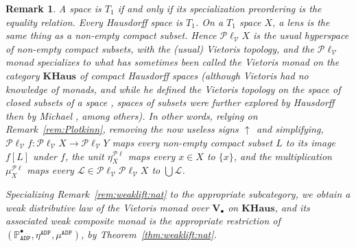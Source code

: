 \documentclass[preprint,12pt]{elsarticle}
\DeclareMathOperator{\upc}{\uparrow\!}
\newcommand\Pred{\mathbb{P}}
\newcommand\Angel{{\mathtt{A}}}
\newcommand\Demon{{\mathtt{D}}}
\newcommand\Nature{{\mathtt{P}}}
\newcommand\ADN{{\Angel\Demon\Nature}}
\newcommand\Plotkin{\mathcal P\ell} %
\newcommand\Plotkinn{\Plotkin_{\mathcal V}}
\newcommand\Val{{\mathbf V}}
\newtheorem{remark}[theorem]{Remark}
\begin{document}
\begin{remark}
  \label{rem:Vietoris}
  A space is $T_1$ if and only if its specialization preordering is
  the equality relation.  Every Hausdorff space is $T_1$.  On a $T_1$
  space $X$, a lens is the same thing as a non-empty compact subset.
  Hence $\Plotkinn X$ is the usual hyperspace of non-empty compact
  subsets, with the (usual) Vietoris topology, and the $\Plotkinn$
  monad specializes to what has sometimes been called the Vietoris
  monad on the category $\mathbf{KHaus}$ of compact Hausdorff spaces
  (although Vietoris had no knowledge of monads, and while he defined
  the Vietoris topology on the space of closed subsets of a space
  \cite{Vietoris:hyper}, spaces of subsets were further explored by
  Hausdorff \cite[\S 28]{Hausdorff:Mengen} then by Michael
  \cite{Michael:hyper}, among others).  In other words, relying on
  Remark~\ref{rem:Plotkinn}, removing the now useless signs $\upc$ and
  simplifying, $\Plotkinn f \colon \Plotkinn X \to \Plotkinn Y$ maps
  every non-empty compact subset $L$ to its image $f [L]$ under $f$,
  the unit $\eta^{\Plotkin}_X$ maps every $x \in X$ to $\{x\}$, and
  the multiplication $\mu^{\Plotkin}_X$ maps every
  $\mathcal L \in \Plotkinn {\Plotkinn X}$ to $\bigcup \mathcal L$.
  
  Specializing Remark~\ref{rem:weaklift:nat} to the appropriate
  subcategory, we obtain a weak distributive law of the Vietoris monad
  over $\Val_\bullet$ on $\mathbf{KHaus}$, and its associated weak
  composite monad is the appropriate restriction of
  $(\Pred_\ADN^\bullet, \eta^\ADN, \mu^\ADN)$, by
  Theorem~\ref{thm:weaklift:nat}.
\end{remark}
\end{document}
